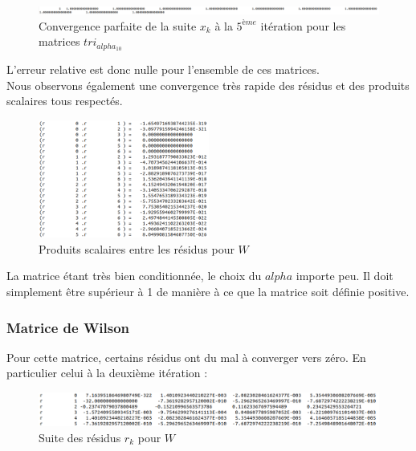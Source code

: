 \documentclass[12,french]{report}
\begin{document}
\begin{figure}[H]
	\centering
	\includegraphics[width=1\textwidth]{./Images/x_tri}
	\caption{Convergence parfaite de la suite $x_k$ à la $5^{ème}$ itération pour les matrices $tri_{alpha_{10}}$}
\end{figure}\vspace{0.2cm}

L'erreur relative est donc nulle pour l'ensemble de ces matrices.\\

Nous observons également une convergence très rapide des résidus et des produits scalaires tous respectés.\\

\begin{figure}[H]
	\centering
	\includegraphics[width=0.5\textwidth]{./Images/ps_tri_20_10}
	\caption{Produits scalaires entre les résidus pour $W$}
\end{figure}\vspace{0.2cm}

La matrice étant très bien conditionnée, le choix du $alpha$ importe peu. Il doit simplement être supérieur à 1 de manière à ce que la matrice soit définie positive.

\subsubsection{Matrice de Wilson}

Pour cette matrice, certains résidus ont du mal à converger vers zéro. En particulier celui à la deuxième itération :\\

\begin{figure}[H]
	\centering
	\includegraphics[width=1\textwidth]{./Images/r_W}
	\caption{Suite des résidus $r_k$ pour $W$}
\end{figure}\vspace{0.2cm}
\end{document}
